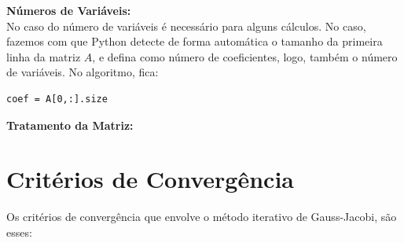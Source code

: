 \documentclass[
	12pt,				%
	openright,			%
	twoside,			%
	a4paper,			%
	english,			%
	french,				%
	spanish,			%
	brazil				%
	]{abntex2_new}
\begin{document}
\begin{alineas}
{}

\item{\textbf{Números de Variáveis:}\\
No caso do número de variáveis é necessário para alguns cálculos. No caso, fazemos 
com que Python detecte de forma automática o tamanho da primeira linha da matriz $A$, 
e defina como número de coeficientes, logo, também o número de variáveis. No algoritmo, fica:
\begin{lstlisting}
coef = A[0,:].size\end{lstlisting}
}

\item{\textbf{Tratamento da Matriz:}\\
	

}
	
\end{alineas}
	



\section{Critérios de Convergência}
Os critérios de convergência que envolve o método iterativo de Gauss-Jacobi, são esses:
\end{document}
